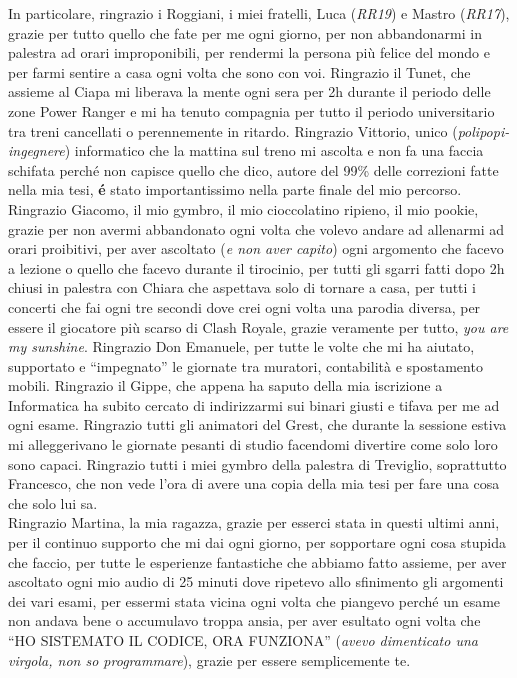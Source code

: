 \noindent In particolare, ringrazio i Roggiani, i miei fratelli, Luca (\textit{RR19}) e Mastro (\textit{RR17}), grazie per tutto quello che fate per me ogni giorno, per non abbandonarmi in palestra ad orari improponibili, per rendermi la persona più felice del mondo e per farmi sentire a casa ogni volta che sono con voi. Ringrazio il Tunet, che assieme al Ciapa mi liberava la mente ogni sera per 2h durante il periodo delle zone Power Ranger e mi ha tenuto compagnia per tutto il periodo universitario tra treni cancellati o perennemente in ritardo. Ringrazio Vittorio, unico (\textit{polipopi-ingegnere}) informatico che la mattina sul treno mi ascolta e non fa una faccia schifata perché non capisce quello che dico, autore del 99\% delle correzioni fatte nella mia tesi, \textbf{é} stato importantissimo nella parte finale del mio percorso. Ringrazio Giacomo, il mio gymbro, il mio cioccolatino ripieno, il mio pookie, grazie per non avermi abbandonato ogni volta che volevo andare ad allenarmi ad orari proibitivi, per aver ascoltato (\textit{e non aver capito}) ogni argomento che facevo a lezione o quello che facevo durante il tirocinio, per tutti gli sgarri fatti dopo 2h chiusi in palestra con Chiara che aspettava solo di tornare a casa, per tutti i concerti che fai ogni tre secondi dove crei ogni volta una parodia diversa, per essere il giocatore più scarso di Clash Royale, grazie veramente per tutto, \textit{you are my sunshine}. Ringrazio Don Emanuele, per tutte le volte che mi ha aiutato, supportato e ``impegnato'' le giornate tra muratori, contabilità e spostamento mobili. Ringrazio il Gippe, che appena ha saputo della mia iscrizione a Informatica ha subito cercato di indirizzarmi sui binari giusti e tifava per me ad ogni esame. Ringrazio tutti gli animatori del Grest, che durante la sessione estiva mi alleggerivano le giornate pesanti di studio facendomi divertire come solo loro sono capaci. Ringrazio tutti i miei gymbro della palestra di Treviglio, soprattutto Francesco, che non vede l'ora di avere una copia della mia tesi per fare una cosa che solo lui sa.  \\

\noindent Ringrazio Martina, la mia ragazza, grazie per esserci stata in questi ultimi anni, per il continuo supporto che mi dai ogni giorno, per sopportare ogni cosa stupida che faccio, per tutte le esperienze fantastiche che abbiamo fatto assieme, per aver ascoltato ogni mio audio di 25 minuti dove ripetevo allo sfinimento gli argomenti dei vari esami, per essermi stata vicina ogni volta che piangevo perché un esame non andava bene o accumulavo troppa ansia, per aver esultato ogni volta che ``HO SISTEMATO IL CODICE, ORA FUNZIONA'' (\textit{avevo dimenticato una virgola, non so programmare}), grazie per essere semplicemente te. \\

